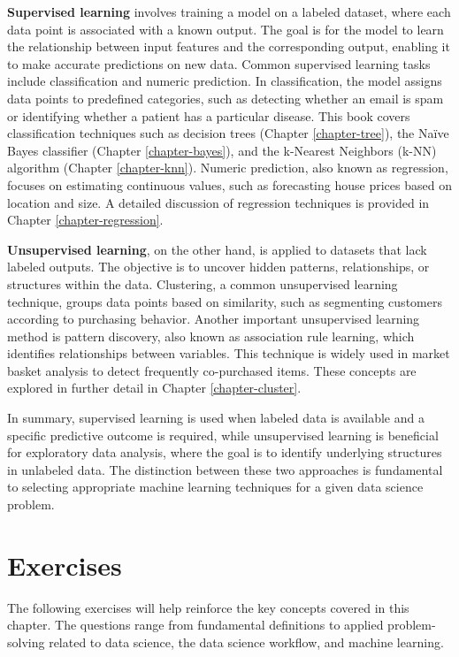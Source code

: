 \documentclass[
]{book}
\theoremstyle{definition}
\theoremstyle{definition}
\theoremstyle{definition}
\theoremstyle{definition}
\theoremstyle{remark}
\begin{document}
\textbf{Supervised learning} involves training a model on a labeled dataset, where each data point is associated with a known output. The goal is for the model to learn the relationship between input features and the corresponding output, enabling it to make accurate predictions on new data. Common supervised learning tasks include classification and numeric prediction. In classification, the model assigns data points to predefined categories, such as detecting whether an email is spam or identifying whether a patient has a particular disease. This book covers classification techniques such as decision trees (Chapter \ref{chapter-tree}), the Naïve Bayes classifier (Chapter \ref{chapter-bayes}), and the k-Nearest Neighbors (k-NN) algorithm (Chapter \ref{chapter-knn}). Numeric prediction, also known as regression, focuses on estimating continuous values, such as forecasting house prices based on location and size. A detailed discussion of regression techniques is provided in Chapter \ref{chapter-regression}.

\textbf{Unsupervised learning}, on the other hand, is applied to datasets that lack labeled outputs. The objective is to uncover hidden patterns, relationships, or structures within the data. Clustering, a common unsupervised learning technique, groups data points based on similarity, such as segmenting customers according to purchasing behavior. Another important unsupervised learning method is pattern discovery, also known as association rule learning, which identifies relationships between variables. This technique is widely used in market basket analysis to detect frequently co-purchased items. These concepts are explored in further detail in Chapter \ref{chapter-cluster}.

In summary, supervised learning is used when labeled data is available and a specific predictive outcome is required, while unsupervised learning is beneficial for exploratory data analysis, where the goal is to identify underlying structures in unlabeled data. The distinction between these two approaches is fundamental to selecting appropriate machine learning techniques for a given data science problem.

\section{Exercises}\label{exercises-1}

The following exercises will help reinforce the key concepts covered in this chapter. The questions range from fundamental definitions to applied problem-solving related to data science, the data science workflow, and machine learning.
\end{document}
